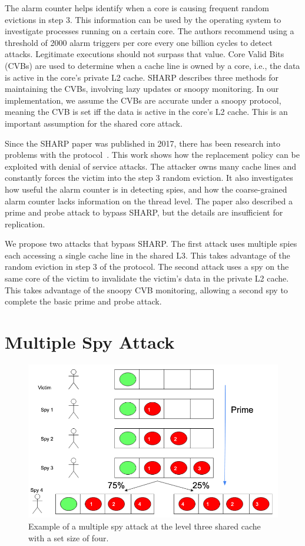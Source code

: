 \documentclass[12pt]{article}
\begin{document}
The alarm counter helps identify when a core is causing frequent random evictions in step $3$.
This information can be used by the operating system to investigate processes running on a certain core. The authors recommend using a threshold of 2000 alarm triggers per core every one billion cycles to detect attacks. Legitimate executions should not surpass that value.
Core Valid Bits (CVBs) are used to determine when a cache line is owned by a core, i.e., the data is active in the core's private L2 cache.
SHARP describes three methods for maintaining the CVBs, involving lazy updates or snoopy monitoring.
In our implementation, we assume the CVBs are accurate under a snoopy protocol, meaning the CVB is set iff the data is active in the core's L2 cache. 
This is an important assumption for the shared core attack.

Since the SHARP paper was published in 2017, there has been research into problems with the protocol~\cite{howSharp}.
This work shows how the replacement policy can be exploited with denial of service attacks.
The attacker owns many cache lines and constantly forces the victim into the step $3$ random eviction.
It also investigates how useful the alarm counter is in detecting spies, and how the coarse-grained alarm counter lacks information on the thread level.
The paper also described a prime and probe attack to bypass SHARP, but the details are insufficient for replication.

We propose two attacks that bypass SHARP.
The first attack uses multiple spies each accessing a single cache line in the shared L3.
This takes advantage of the random eviction in step $3$ of the protocol.
The second attack uses a spy on the same core of the victim to invalidate the victim's data in the private L2 cache.
This takes advantage of the snoopy CVB monitoring, allowing a second spy to complete the basic prime and probe attack.

\section{Multiple Spy Attack}

\begin{figure}[h]
\centering
\includegraphics[scale=0.9]{../presentation/shared.png}
\caption{Example of a multiple spy attack at the level three shared cache with a set size of four.}
\label{fig:ms}
\end{figure}
\end{document}
